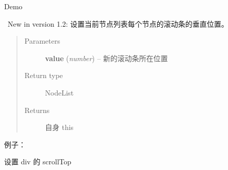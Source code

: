 \documentclass[letterpaper,10pt,english]{sphinxmanual}
\begin{document}
Demo


\begin{fulllineitems}
~New in version 1.2: 设置当前节点列表每个节点的滚动条的垂直位置。\begin{quote}\begin{description}
\item[{Parameters}] \leavevmode
\textbf{value} (\emph{number}) -- 新的滚动条所在位置

\item[{Return type}] \leavevmode
NodeList

\item[{Returns}] \leavevmode
自身 this

\end{description}\end{quote}

\end{fulllineitems}


例子：

设置 div 的 scrollTop
\end{document}
